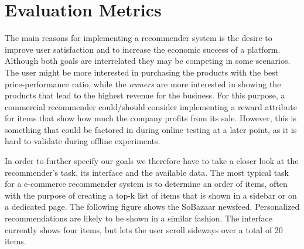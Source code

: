 \section{Evaluation Metrics}
\label{sec:eval-metrics}


The main reasons for implementing a recommender system is the desire to improve user
satisfaction and to increase the economic success of a platform. Although both goals are
interrelated they may be competing in some scenarios. The user might be more interested in purchasing
the products with the best price-performance ratio, while the \emph{owners}
are more interested in showing the products that lead to the highest revenue for the
business. For this purpose, a commercial recommender could/should consider implementing
a reward attribute for items that show how much the company profits from its sale. However,
this is something that could be factored in during online testing at a later point, as it is
hard to validate during offline experiments.

In order to further specify our goals we therefore have to take a closer look at the recommender's task,
its interface and the available data. The most typical task for a e-commerce recommender system is to
determine an order of items, often with the purpose of creating a top-k list of items that is shown in a sidebar
or on a dedicated page. The following figure shows the SoBazaar newsfeed. Personalized recommendations are likely
to be shown in a similar fashion. The interface currently shows four items, but lets the
user scroll sideways over a total of 20 items.

